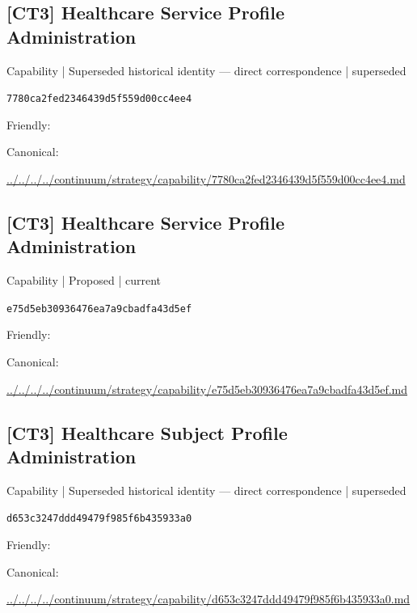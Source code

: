 \documentclass[10pt,a4paper]{article}
\begin{document}
\subsection*{[CT3] Healthcare Service Profile Administration}
{\small Capability | Superseded historical identity — direct correspondence | superseded}\par
\texttt{7780ca2fed2346439d5f559d00cc4ee4}\par
Friendly: \par
Canonical: \par
{\footnotesize\url{../../../../continuum/strategy/capability/7780ca2fed2346439d5f559d00cc4ee4.md}}\par
\subsection*{[CT3] Healthcare Service Profile Administration}
{\small Capability | Proposed | current}\par
\texttt{e75d5eb30936476ea7a9cbadfa43d5ef}\par
Friendly: \par
Canonical: \par
{\footnotesize\url{../../../../continuum/strategy/capability/e75d5eb30936476ea7a9cbadfa43d5ef.md}}\par
\subsection*{[CT3] Healthcare Subject Profile Administration}
{\small Capability | Superseded historical identity — direct correspondence | superseded}\par
\texttt{d653c3247ddd49479f985f6b435933a0}\par
Friendly: \par
Canonical: \par
{\footnotesize\url{../../../../continuum/strategy/capability/d653c3247ddd49479f985f6b435933a0.md}}\par
\end{document}
